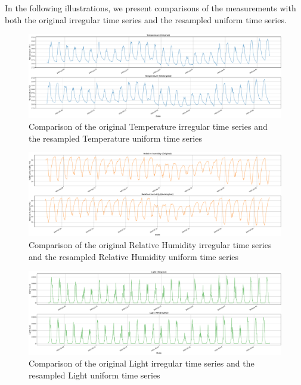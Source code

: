 In the following illustrations, we present comparisons of the measurements with both the original irregular time series and the resampled uniform time series.

\begin{figure}[htbp]
    \centering
    \includegraphics[width=15 cm]{5_ChapterDesign/figuras/5_Irregular/comparison_Temperature.pdf}
    \caption{Comparison of the original Temperature irregular time series and the resampled Temperature uniform time series}
\end{figure}

\begin{figure}[htbp]
    \centering
    \includegraphics[width=15 cm]{5_ChapterDesign/figuras/5_Irregular/comparison_Relative_humidity.pdf}
    \caption{Comparison of the original Relative Humidity irregular time series and the resampled Relative Humidity uniform time series}
\end{figure}

\begin{figure}[htbp]
    \centering
    \includegraphics[width=15 cm]{5_ChapterDesign/figuras/5_Irregular/comparison_Light.pdf}
    \caption{Comparison of the original Light irregular time series and the resampled Light uniform time series}
\end{figure}

